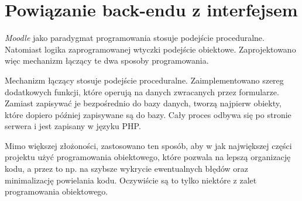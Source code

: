 \section{Powiązanie back-endu z interfejsem}
\label{Chapter67}

\emph{Moodle} jako paradygmat programowania stosuje podejście proceduralne. Natomiast logika zaprogramowanej wtyczki podejście obiektowe. Zaprojektowano więc mechanizm łączący te dwa sposoby programowania.

Mechanizm łączący stosuje podejście proceduralne. Zaimplementowano szereg dodatkowych funkcji, które operują na danych zwracanych przez formularze. Zamiast zapisywać je bezpośrednio do bazy danych, tworzą najpierw obiekty, które dopiero później zapisywane są do bazy. Cały proces odbywa się po stronie serwera i jest zapisany w języku PHP. 

Mimo większej złożoności, zastosowano ten sposób, aby w jak największej części projektu użyć programowania obiektowego, które pozwala na lepszą organizację kodu, a przez to np. na szybsze wykrycie ewentualnych błędów oraz minimalizację powielania kodu. Oczywiście są to tylko niektóre z zalet programowania obiektowego.
